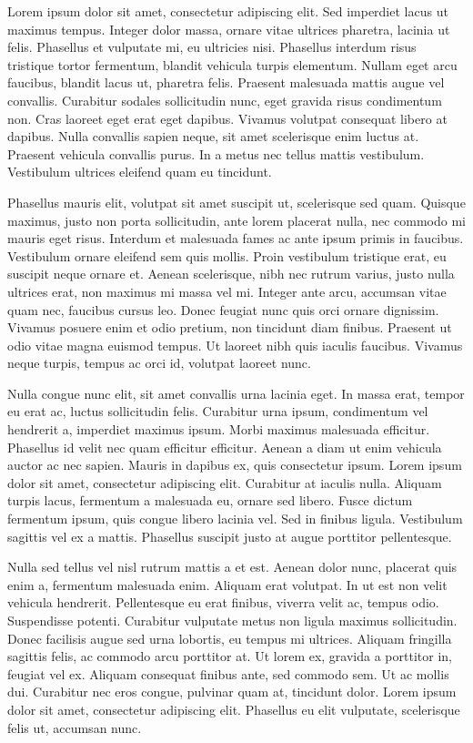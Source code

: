 \documentclass[
  12pt,
  a4paper,
  oneside]{book}
\begin{document}
Lorem ipsum dolor sit amet, consectetur adipiscing elit. Sed imperdiet lacus ut maximus tempus. Integer dolor massa, ornare vitae ultrices pharetra, lacinia ut felis. Phasellus et vulputate mi, eu ultricies nisi. Phasellus interdum risus tristique tortor fermentum, blandit vehicula turpis elementum. Nullam eget arcu faucibus, blandit lacus ut, pharetra felis. Praesent malesuada mattis augue vel convallis. Curabitur sodales sollicitudin nunc, eget gravida risus condimentum non. Cras laoreet eget erat eget dapibus. Vivamus volutpat consequat libero at dapibus. Nulla convallis sapien neque, sit amet scelerisque enim luctus at. Praesent vehicula convallis purus. In a metus nec tellus mattis vestibulum. Vestibulum ultrices eleifend quam eu tincidunt.

Phasellus mauris elit, volutpat sit amet suscipit ut, scelerisque sed quam. Quisque maximus, justo non porta sollicitudin, ante lorem placerat nulla, nec commodo mi mauris eget risus. Interdum et malesuada fames ac ante ipsum primis in faucibus. Vestibulum ornare eleifend sem quis mollis. Proin vestibulum tristique erat, eu suscipit neque ornare et. Aenean scelerisque, nibh nec rutrum varius, justo nulla ultrices erat, non maximus mi massa vel mi. Integer ante arcu, accumsan vitae quam nec, faucibus cursus leo. Donec feugiat nunc quis orci ornare dignissim. Vivamus posuere enim et odio pretium, non tincidunt diam finibus. Praesent ut odio vitae magna euismod tempus. Ut laoreet nibh quis iaculis faucibus. Vivamus neque turpis, tempus ac orci id, volutpat laoreet nunc.

Nulla congue nunc elit, sit amet convallis urna lacinia eget. In massa erat, tempor eu erat ac, luctus sollicitudin felis. Curabitur urna ipsum, condimentum vel hendrerit a, imperdiet maximus ipsum. Morbi maximus malesuada efficitur. Phasellus id velit nec quam efficitur efficitur. Aenean a diam ut enim vehicula auctor ac nec sapien. Mauris in dapibus ex, quis consectetur ipsum. Lorem ipsum dolor sit amet, consectetur adipiscing elit. Curabitur at iaculis nulla. Aliquam turpis lacus, fermentum a malesuada eu, ornare sed libero. Fusce dictum fermentum ipsum, quis congue libero lacinia vel. Sed in finibus ligula. Vestibulum sagittis vel ex a mattis. Phasellus suscipit justo at augue porttitor pellentesque.

Nulla sed tellus vel nisl rutrum mattis a et est. Aenean dolor nunc, placerat quis enim a, fermentum malesuada enim. Aliquam erat volutpat. In ut est non velit vehicula hendrerit. Pellentesque eu erat finibus, viverra velit ac, tempus odio. Suspendisse potenti. Curabitur vulputate metus non ligula maximus sollicitudin. Donec facilisis augue sed urna lobortis, eu tempus mi ultrices. Aliquam fringilla sagittis felis, ac commodo arcu porttitor at. Ut lorem ex, gravida a porttitor in, feugiat vel ex. Aliquam consequat finibus ante, sed commodo sem. Ut ac mollis dui. Curabitur nec eros congue, pulvinar quam at, tincidunt dolor. Lorem ipsum dolor sit amet, consectetur adipiscing elit. Phasellus eu elit vulputate, scelerisque felis ut, accumsan nunc.
\end{document}
